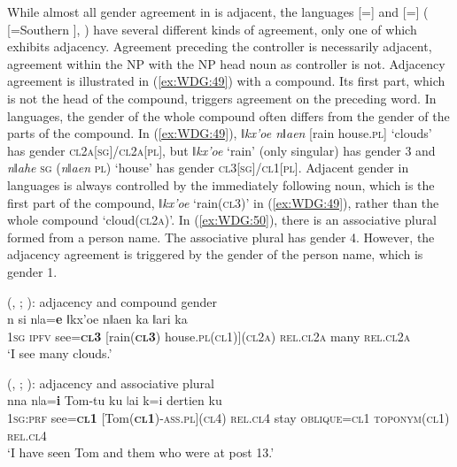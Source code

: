 \documentclass[output=collectionpaper]{langsci/langscibook}
\begin{document}
While almost all gender agreement in  is adjacent, the  languages  [=] and  [=] ( [=Southern ], ) have several different kinds of agreement, only one of which exhibits adjacency. Agreement preceding the controller is necessarily adjacent, agreement within the NP with the NP head noun as controller is not. Adjacency agreement is illustrated in (\ref{ex:WDG:49}) with a compound. Its first part, which is not the head of the compound, triggers agreement on the preceding word. In  languages, the gender of the whole compound often differs from the gender of the parts of the compound. In (\ref{ex:WDG:49}), \textit{ǁkx'oe nǁaen} [rain house.\textsc{pl}] `clouds' has gender \textsc{cl2a[sg]/cl2a[pl]}, but \textit{ǁkx'oe} `rain' (only singular) has gender 3 and \textit{nǁahe} \textsc{sg} (\textit{nǁaen} \textsc{pl}) `house' has gender \textsc{cl3[sg]/cl1[pl]}. Adjacent gender in  languages is always controlled by the immediately following noun, which is the first part of the compound, \textit{ǁkx'oe} `rain(\textsc{cl3})' in (\ref{ex:WDG:49}), rather than the whole compound `cloud(\textsc{cl2a})'. In (\ref{ex:WDG:50}), there is an associative plural formed from a person name. The associative plural has gender 4. However, the adjacency agreement is triggered by the gender of the person name, which is gender 1.
\largerpage

\ea\label{ex:WDG:49}
 (, ; \citealt{Gueldemann2004}): adjacency and compound gender\\
\gll n 	si 	nǀa=\textbf{e} 	ǁkx'oe	nǁaen 	ka 	ǁari 	ka\\
\textsc{1sg} 	\textsc{ipfv} 	see=\textbf{\textsc{cl3}} 	[rain(\textbf{\textsc{cl3}}) 	house.\textsc{pl(cl1)](cl2a)} 	\textsc{rel.cl2a}	many 	\textsc{rel.cl2a}\\
\glt `I see many clouds.'\\
\z

\ea\label{ex:WDG:50}
 (, ; \citealt{Gueldemann2006}): adjacency and associative plural\\
\gll nna	nǀa=\textbf{i}	Tom-tu	ku	ǀai	k=i	dertien	ku\\
\textsc{1sg:prf}	see=\textbf{\textsc{cl1}}	[Tom(\textbf{\textsc{cl1}})-\textsc{ass.pl](cl4)}	\textsc{rel.cl4}	stay	\textsc{oblique=cl1}	\textsc{toponym(cl1)}	\textsc{rel.cl4}\\
\glt `I have seen Tom and them who were at post 13.'\\
\z
\end{document}
